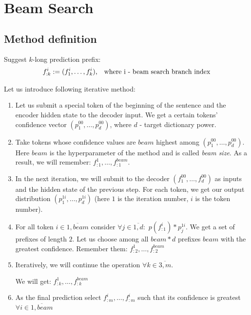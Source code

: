 \documentclass[a4paper,14pt]{extarticle}
\begin{document}
	\section{Beam Search}
	\subsection{Method definition}
	Suggest $k$-long prediction prefix:
	\begin{equation}
		f_{:k}^{i} := (f_1^{i}, \dots, f_k^{i}) \text{, \,\, where i - beam search branch index}
	\end{equation}
	
	Let us introduce following iterative method:
	
	\begin{enumerate}
		\item Let us submit a special token of the beginning of the sentence and the encoder hidden state to the decoder input. We get a certain tokens' confidence vector $(p_1^{00}, \dots, p_d^{00})$, where $d$ - target dictionary power.
		
		\item Take tokens whose confidence values are $beam$ highest among $ (p_1^{00}, \dots, p_d^{00})$. Here $beam$ is the hyperparameter of the method and is called \textit{beam size}. As a result, we will remember: $f_{:1}^1, \dots, f_{:1}^{beam}$. 
		
		\item In the next iteration, we will submit to the decoder $(f_1^{00}, \dots, f_d^{00})$ as inputs and the hidden state of the previous step. For each token, we get our output distribution $(p_1^{1i}, \dots, p_d^{1i})$ (here $1$ is the iteration number, $i$ is the token number).
		\item For all token $i \in \overline{1, beam}$ consider $\forall j \in \overline{1, d}: \,\, p(f_{:1}^i) * p_j^{1i}$. We get a set of prefixes of length $2$. Let us choose among all $beam * d$ prefixes $beam$ with the greatest confidence. Remember them: $f_{:2}^1, \dots, f_{:2}^{beam}$
		
		\item Iteratively, we will continue the operation $\forall k \in \overline{3, m}$. 
		
		We will get: $f_ {: k}^1, \dots, f_{:k}^{beam}$
		
		\item As the final prediction select $f_{:m}^i, \dots, f_{:m}^i$ such that its confidence is greatest $\forall i \in \overline{1, beam}$
	\end{enumerate}
	
\end{document}
